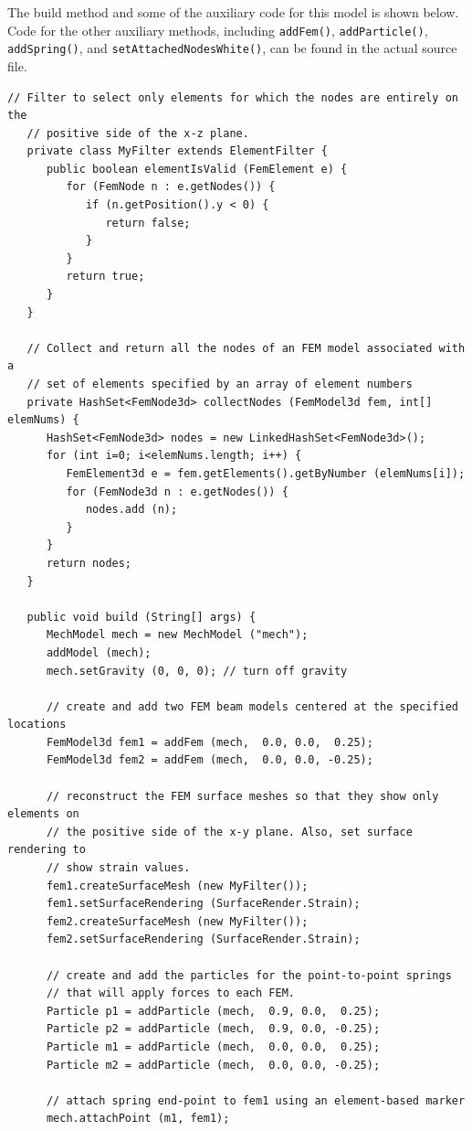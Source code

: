 The build method and some of the auxiliary code for this model is shown below.
Code for the other auxiliary methods, including {\tt addFem()},
{\tt addParticle()}, {\tt addSpring()}, and {\tt setAttachedNodesWhite()},
can be found in the actual source file.
\lstset{numbers=left}
\begin{lstlisting}[]
   // Filter to select only elements for which the nodes are entirely on the
   // positive side of the x-z plane.
   private class MyFilter extends ElementFilter {
      public boolean elementIsValid (FemElement e) {
         for (FemNode n : e.getNodes()) {
            if (n.getPosition().y < 0) {
               return false;
            }
         }
         return true;         
      }
   }

   // Collect and return all the nodes of an FEM model associated with a
   // set of elements specified by an array of element numbers
   private HashSet<FemNode3d> collectNodes (FemModel3d fem, int[] elemNums) {
      HashSet<FemNode3d> nodes = new LinkedHashSet<FemNode3d>();
      for (int i=0; i<elemNums.length; i++) {
         FemElement3d e = fem.getElements().getByNumber (elemNums[i]);
         for (FemNode3d n : e.getNodes()) {
            nodes.add (n);
         }
      }
      return nodes;
   }

   public void build (String[] args) {
      MechModel mech = new MechModel ("mech");
      addModel (mech);
      mech.setGravity (0, 0, 0); // turn off gravity

      // create and add two FEM beam models centered at the specified locations
      FemModel3d fem1 = addFem (mech,  0.0, 0.0,  0.25);
      FemModel3d fem2 = addFem (mech,  0.0, 0.0, -0.25);

      // reconstruct the FEM surface meshes so that they show only elements on
      // the positive side of the x-y plane. Also, set surface rendering to
      // show strain values.
      fem1.createSurfaceMesh (new MyFilter());
      fem1.setSurfaceRendering (SurfaceRender.Strain);
      fem2.createSurfaceMesh (new MyFilter());
      fem2.setSurfaceRendering (SurfaceRender.Strain);

      // create and add the particles for the point-to-point springs
      // that will apply forces to each FEM.
      Particle p1 = addParticle (mech,  0.9, 0.0,  0.25);
      Particle p2 = addParticle (mech,  0.9, 0.0, -0.25);
      Particle m1 = addParticle (mech,  0.0, 0.0,  0.25);
      Particle m2 = addParticle (mech,  0.0, 0.0, -0.25);

      // attach spring end-point to fem1 using an element-based marker
      mech.attachPoint (m1, fem1);


\end{lstlisting}
